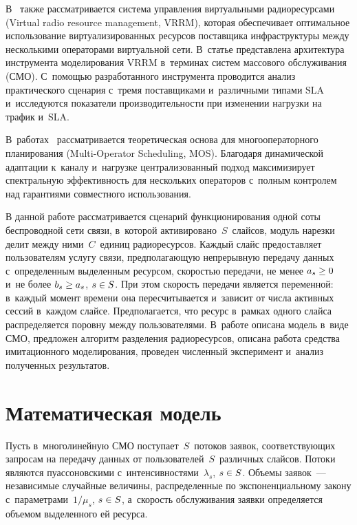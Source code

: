 \begin{multicols}{2}
  В~\cite{5-sop} также рассматривается система управления виртуальными 
радиоресурсами (Virtual radio resource management, VRRM), которая 
обеспечивает оптимальное использование виртуализированных ресурсов 
поставщика инфраструктуры между несколькими операторами виртуальной 
сети. В~статье представлена архитектура инструмента моделирования VRRM 
в~терминах систем массового обслуживания (СМО). С~по\-мощью разработанного 
инструмента проводится анализ практического сценария с~тремя поставщиками 
и~различными типами SLA и~исследуются показатели производительности при 
изменении нагрузки на трафик и~SLA.
  
  В~работах~\cite{6-sop, 7-sop} рассматривается теоретическая основа для 
многооператорного планирования (Multi-Operator Scheduling, MOS). Благодаря 
динамической адаптации к~каналу и~нагрузке централизованный подход 
максимизирует спектральную эффективность для нескольких операторов 
с~полным контролем над гарантиями совместного использования. 
  
  В данной работе рассматривается сценарий функционирования одной соты 
беспроводной сети связи, в~которой активировано~$S$~слайсов, модуль 
нарезки делит между ними~$C$~единиц радиоресурсов. Каждый слайс 
предоставляет пользователям услугу связи, предполагающую непрерывную 
передачу данных с~определенным выделенным ресурсом, скоростью передачи, 
не менее $a_s\hm\geq 0$ и~не более $b_s\hm\geq a_s$, $s\hm\in S$. 
При этом скорость передачи является переменной: в~каждый момент времени 
она пересчитывается и~зависит от числа активных сессий в~каждом слайсе. 
Предполагается, что ресурс в~рамках одного слайса распределяется поровну 
между пользователями. В~работе описана модель в~виде 
СМО, предложен алгоритм разделения радиоресурсов, описана 
работа средства имитационного моделирования, проведен численный 
эксперимент и~анализ полученных результатов.

\section{Математическая модель}

  Пусть в~многолинейную СМО
поступает~$S$~потоков заявок, соответствующих запросам на передачу 
данных от пользователей~$S$~различных слайсов. Потоки являются 
пуассоновскими с~интенсивностями~$\lambda_s$, $s\hm\in S$. Объемы  
заявок~--- независимые случайные величины, распределенные по 
экспоненциальному закону с~параметрами~$1/\mu_s$, $s\hm\in S$, а~скорость 
обслуживания заявки определяется объемом выделенного ей ресурса. 
  

\end{multicols}
